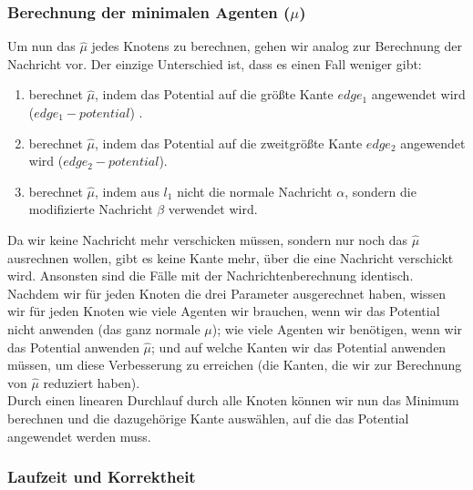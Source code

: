 	
	\subsubsection{Berechnung der minimalen Agenten ($\mu$)}
	
	Um nun das $\hat{\mu}$ jedes Knotens zu berechnen, gehen wir analog zur Berechnung der Nachricht vor. Der einzige Unterschied ist, dass es einen Fall weniger gibt: 
	\begin{enumerate}
		\item berechnet $\hat{\mu}$, indem das Potential auf die größte Kante $edge_{1}$ angewendet wird ($edge_{1} - potential$) .
		\item berechnet $\hat{\mu}$, indem das Potential auf die zweitgrößte Kante $edge_{2}$ angewendet wird ($edge_{2} - potential$).
		\item berechnet $\hat{\mu}$, indem aus $l_{1}$ nicht die normale Nachricht $\alpha$, sondern die modifizierte Nachricht $\beta$ verwendet wird.
	\end{enumerate}
	Da wir keine Nachricht mehr verschicken müssen, sondern nur noch das $\hat{\mu}$ ausrechnen wollen, gibt es keine Kante mehr, über die eine Nachricht verschickt wird. Ansonsten sind die Fälle mit der Nachrichtenberechnung identisch.\\
	Nachdem wir für jeden Knoten die drei Parameter ausgerechnet haben, wissen wir für jeden Knoten wie viele Agenten wir brauchen, wenn wir das Potential nicht anwenden (das ganz normale $\mu$); wie viele Agenten wir benötigen, wenn wir das Potential anwenden $\hat{\mu}$; und auf welche Kanten wir das Potential anwenden müssen, um diese Verbesserung zu erreichen (die Kanten, die wir zur Berechnung von $\hat{\mu}$ reduziert haben).\\
	Durch einen linearen Durchlauf durch alle Knoten können wir nun das Minimum berechnen und die dazugehörige Kante auswählen, auf die das Potential angewendet werden muss.
	
	
	\subsubsection{Laufzeit und Korrektheit}
	
